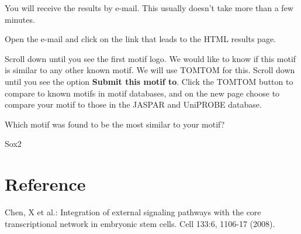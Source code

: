 \begin{note}
You will receive the results by e-mail. This usually doesn't take more than a few minutes.
\end{note}

\begin{steps}
Open the e-mail and click on the link that leads to the HTML results page.

Scroll down until you see the first motif logo. We would like to know if this
motif is similar to any other known motif. We will use TOMTOM for this. Scroll
down until you see the option \textbf{Submit this motif to}. Click the TOMTOM
button to compare to known motifs in motif databases, and on the new page choose
to compare your motif to those in the JASPAR and UniPROBE database.
\end{steps}


\begin{questions}
Which motif was found to be the most similar to your motif?
\begin{answer}
Sox2
\end{answer}
\end{questions}

\newpage
\section{Reference}
Chen, X et al.: Integration of external signaling pathways with the core transcriptional network in embryonic stem cells. Cell 133:6, 1106-17 (2008).
